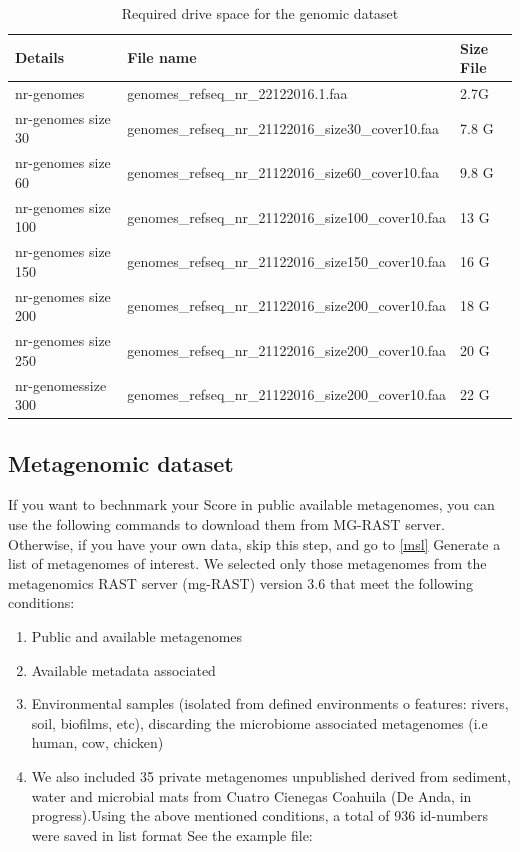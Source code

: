\documentclass[12pt]{report}
\begin{document}
\begin{table}[H]
\centering
\caption{Required drive space for the genomic dataset}
\label{sizes}
\begin{tabular}{@{}lll@{}}
\toprule
Details             & File name                                           & Size File \\ \midrule
nr-genomes          & genomes\_refseq\_nr\_22122016.1.faa                 & 2.7G      \\
nr-genomes size 30  & genomes\_refseq\_nr\_21122016\_size30\_cover10.faa  & 7.8 G     \\
nr-genomes size 60  & genomes\_refseq\_nr\_21122016\_size60\_cover10.faa  & 9.8 G     \\
nr-genomes size 100 & genomes\_refseq\_nr\_21122016\_size100\_cover10.faa & 13 G      \\
nr-genomes size 150 & genomes\_refseq\_nr\_21122016\_size150\_cover10.faa & 16 G      \\
nr-genomes size 200 & genomes\_refseq\_nr\_21122016\_size200\_cover10.faa & 18 G      \\
nr-genomes size 250 & genomes\_refseq\_nr\_21122016\_size200\_cover10.faa & 20 G      \\
nr-genomessize 300  & genomes\_refseq\_nr\_21122016\_size200\_cover10.faa & 22 G      \\ \bottomrule
\end{tabular}
\end{table}

\subsection{Metagenomic dataset}
If you want to bechnmark your Score in public available metagenomes, you can
use the following commands to download them from MG-RAST server. Otherwise, if
you have your own data, skip this step, and go to \ref{msl}
Generate a list of metagenomes of interest. We selected only those metagenomes
from the metagenomics RAST server (mg-RAST) version 3.6 that meet the following
conditions:
\begin{enumerate}
\item Public and available metagenomes
\item Available metadata associated 
\item Environmental samples (isolated from defined environments o features:
rivers, soil, biofilms, etc), discarding the microbiome associated metagenomes
(i.e human, cow, chicken)
\item We also included 35 private metagenomes unpublished derived from
sediment, water and microbial mats from Cuatro Cienegas Coahuila (De Anda, in
progress).Using the above mentioned conditions, a total of 936 id-numbers were
saved in list format
See the example file: 
\end{enumerate}
\end{document}
